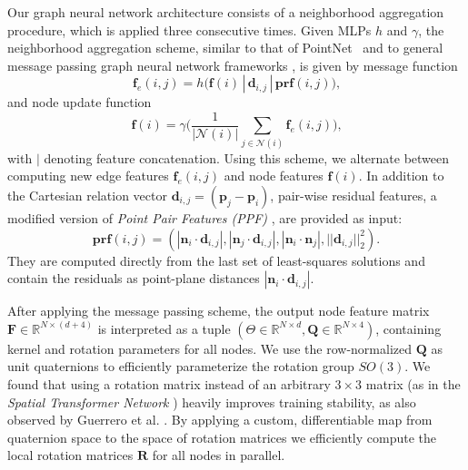 \documentclass[10pt,twocolumn,letterpaper]{article}
\begin{document}
Our graph neural network architecture consists of a neighborhood aggregation procedure, which is applied three consecutive times. Given MLPs $h$ and $\gamma$, the neighborhood aggregation scheme, similar to that of \mbox{PointNet \cite{Qi:2017}} and to general message passing graph neural network frameworks \cite{Hamilton:2017, Morris:2019}, is given by message function
\begin{equation}
\mathbf{f}_e(i,j) = h\big(\mathbf{f}(i)\,|\,\mathbf{d}_{i,j}\,|\,\mathbf{prf}(i, j)\big) \textrm{,}  
\end{equation}
 and node update function
\begin{equation}
\mathbf{f}(i) = \gamma\Big(\frac{1}{|\mathcal{N}(i)|}\sum_{j\in \mathcal{N}(i)} \mathbf{f}_e(i,j)\Big) \textrm{,} 
\end{equation}
 with $|$ denoting feature concatenation. Using this scheme, we alternate between computing new edge features $\mathbf{f}_e(i,j)$ and node features $\mathbf{f}(i)$. 
 In addition to the Cartesian relation vector \mbox{$\mathbf{d}_{i,j} = (\mathbf{p}_j - \mathbf{p}_i)$}, pair-wise residual features, a modified version of \emph{Point Pair Features (PPF)} \cite{Deng:2018b, Deng:2018a}, are provided as input:
\begin{equation}
    \mathbf{prf}(i, j) = (|\mathbf{n}_i \cdot \mathbf{d}_{i,j}|, |\mathbf{n}_j \cdot \mathbf{d}_{i,j}|, |\mathbf{n}_i \cdot \mathbf{n}_j|, ||\mathbf{d}_{i,j}||_2^2) \textrm{.}
\end{equation}
They are computed directly from the last set of least-squares solutions and contain the residuals as point-plane distances $|\mathbf{n}_i \cdot \mathbf{d}_{i,j}|$. 

After applying the message passing scheme, the output node feature matrix $\mathbf{F} \in \mathbb{R}^{N\times(d+4)}$ is interpreted as a tuple $(\Theta \in \mathbb{R}^{N \times d}, \mathbf{Q} \in \mathbb{R}^{N\times 4})$, containing kernel and rotation parameters for all nodes. We use the row-normalized $\mathbf{Q}$ as unit quaternions to efficiently parameterize the rotation group $SO(3)$. We found that using a rotation matrix instead of an arbitrary $3\times3$ matrix (as in the \emph{Spatial Transformer Network} \cite{Jaderberg:2015}) heavily improves training stability, as also observed by Guerrero et al. \cite{Guerrero:2018}. By applying a custom, differentiable map from quaternion space to the space of rotation matrices we efficiently compute the local rotation matrices $\mathbf{R}$ for all nodes in parallel.
\end{document}

